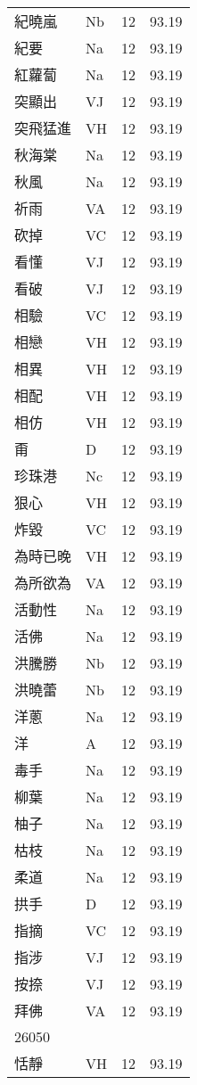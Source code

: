 \documentclass[twocolumn]{book}
\begin{document}
\begin{supertabular}{llrr}
紀曉嵐 & Nb & 12 &  93.19\\
紀要 & Na & 12 &  93.19\\
紅蘿蔔 & Na & 12 &  93.19\\
突顯出 & VJ & 12 &  93.19\\
突飛猛進 & VH & 12 &  93.19\\
秋海棠 & Na & 12 &  93.19\\
秋風 & Na & 12 &  93.19\\
祈雨 & VA & 12 &  93.19\\
砍掉 & VC & 12 &  93.19\\
看懂 & VJ & 12 &  93.19\\
看破 & VJ & 12 &  93.19\\
相驗 & VC & 12 &  93.19\\
相戀 & VH & 12 &  93.19\\
相異 & VH & 12 &  93.19\\
相配 & VH & 12 &  93.19\\
相仿 & VH & 12 &  93.19\\
甭 & D & 12 &  93.19\\
珍珠港 & Nc & 12 &  93.19\\
狠心 & VH & 12 &  93.19\\
炸毀 & VC & 12 &  93.19\\
為時已晚 & VH & 12 &  93.19\\
為所欲為 & VA & 12 &  93.19\\
活動性 & Na & 12 &  93.19\\
活佛 & Na & 12 &  93.19\\
洪騰勝 & Nb & 12 &  93.19\\
洪曉蕾 & Nb & 12 &  93.19\\
洋蔥 & Na & 12 &  93.19\\
洋 & A & 12 &  93.19\\
毒手 & Na & 12 &  93.19\\
柳葉 & Na & 12 &  93.19\\
柚子 & Na & 12 &  93.19\\
枯枝 & Na & 12 &  93.19\\
柔道 & Na & 12 &  93.19\\
拱手 & D & 12 &  93.19\\
指摘 & VC & 12 &  93.19\\
指涉 & VJ & 12 &  93.19\\
按捺 & VJ & 12 &  93.19\\
拜佛 & VA & 12 &  93.19\\
26050\\
恬靜 & VH & 12 &  93.19\\

\end{supertabular}
\end{document}

